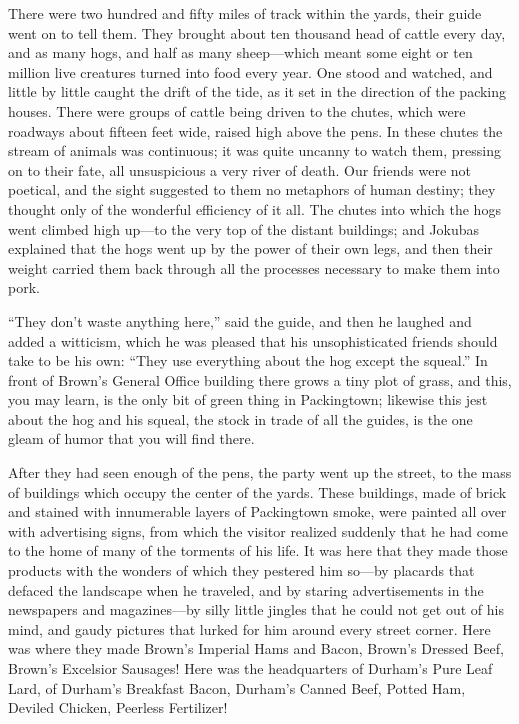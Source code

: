 \documentclass[
]{article}
\begin{document}
There were two hundred and fifty miles of track within the yards, their guide went on to tell them. They brought about ten thousand head of cattle every day, and as many hogs, and half as many sheep---which meant some eight or ten million live creatures turned into food every year. One stood and watched, and little by little caught the drift of the tide, as it set in the direction of the packing houses. There were groups of cattle being driven to the chutes, which were roadways about fifteen feet wide, raised high above the pens. In these chutes the stream of animals was continuous; it was quite uncanny to watch them, pressing on to their fate, all unsuspicious a very river of death. Our friends were not poetical, and the sight suggested to them no metaphors of human destiny; they thought only of the wonderful efficiency of it all. The chutes into which the hogs went climbed high up---to the very top of the distant buildings; and Jokubas explained that the hogs went up by the power of their own legs, and then their weight carried them back through all the processes necessary to make them into pork.

``They don't waste anything here,'' said the guide, and then he laughed and added a witticism, which he was pleased that his unsophisticated friends should take to be his own: ``They use everything about the hog except the squeal.'' In front of Brown's General Office building there grows a tiny plot of grass, and this, you may learn, is the only bit of green thing in Packingtown; likewise this jest about the hog and his squeal, the stock in trade of all the guides, is the one gleam of humor that you will find there.

After they had seen enough of the pens, the party went up the street, to the mass of buildings which occupy the center of the yards. These buildings, made of brick and stained with innumerable layers of Packingtown smoke, were painted all over with advertising signs, from which the visitor realized suddenly that he had come to the home of many of the torments of his life. It was here that they made those products with the wonders of which they pestered him so---by placards that defaced the landscape when he traveled, and by staring advertisements in the newspapers and magazines---by silly little jingles that he could not get out of his mind, and gaudy pictures that lurked for him around every street corner. Here was where they made Brown's Imperial Hams and Bacon, Brown's Dressed Beef, Brown's Excelsior Sausages! Here was the headquarters of Durham's Pure Leaf Lard, of Durham's Breakfast Bacon, Durham's Canned Beef, Potted Ham, Deviled Chicken, Peerless Fertilizer!
\end{document}
